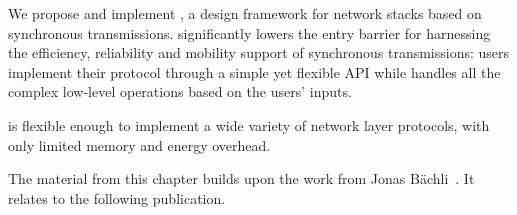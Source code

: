 We propose and implement \baloo, a design framework for network stacks based on synchronous transmissions.
\baloo significantly lowers the entry barrier for harnessing the efficiency, reliability and mobility support of synchronous transmissions: users implement their protocol through a simple yet flexible API while \baloo handles all the complex low-level operations based on the users' inputs.

\baloo is flexible enough to implement a wide variety of network layer protocols, with only limited memory and energy overhead.

\begin{publi}

  The material from this chapter builds upon the work from Jonas Bächli~\cite{bachli2018Creating}. It relates to the following publication.


\end{publi}

